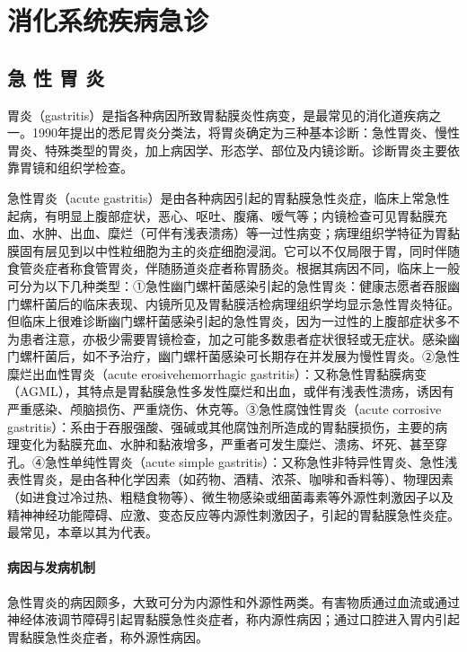 \part{消化系统疾病急诊}

\chapter{急 性 胃 炎}

胃炎（gastritis）是指各种病因所致胃黏膜炎性病变，是最常见的消化道疾病之一。1990年提出的悉尼胃炎分类法，将胃炎确定为三种基本诊断：急性胃炎、慢性胃炎、特殊类型的胃炎，加上病因学、形态学、部位及内镜诊断。诊断胃炎主要依靠胃镜和组织学检查。

急性胃炎（acute
gastritis）是由各种病因引起的胃黏膜急性炎症，临床上常急性起病，有明显上腹部症状，恶心、呕吐、腹痛、嗳气等；内镜检查可见胃黏膜充血、水肿、出血、糜烂（可伴有浅表溃疡）等一过性病变；病理组织学特征为胃黏膜固有层见到以中性粒细胞为主的炎症细胞浸润。它可以不仅局限于胃，同时伴随食管炎症者称食管胃炎，伴随肠道炎症者称胃肠炎。根据其病因不同，临床上一般可分为以下几种类型：①急性幽门螺杆菌感染引起的急性胃炎：健康志愿者吞服幽门螺杆菌后的临床表现、内镜所见及胃黏膜活检病理组织学均显示急性胃炎特征。但临床上很难诊断幽门螺杆菌感染引起的急性胃炎，因为一过性的上腹部症状多不为患者注意，亦极少需要胃镜检查，加之可能多数患者症状很轻或无症状。感染幽门螺杆菌后，如不予治疗，幽门螺杆菌感染可长期存在并发展为慢性胃炎。②急性糜烂出血性胃炎（acute
erosivehemorrhagic
gastritis）：又称急性胃黏膜病变（AGML），其特点是胃黏膜急性多发性糜烂和出血，或伴有浅表性溃疡，诱因有严重感染、颅脑损伤、严重烧伤、休克等。③急性腐蚀性胃炎（acute
corrosive
gastritis）：系由于吞服强酸、强碱或其他腐蚀剂所造成的胃黏膜损伤，主要的病理变化为黏膜充血、水肿和黏液增多，严重者可发生糜烂、溃疡、坏死、甚至穿孔。④急性单纯性胃炎（acute
simple
gastritis）：又称急性非特异性胃炎、急性浅表性胃炎，是由各种化学因素（如药物、酒精、浓茶、咖啡和香料等）、物理因素（如进食过冷过热、粗糙食物等）、微生物感染或细菌毒素等外源性刺激因子以及精神神经功能障碍、应激、变态反应等内源性刺激因子，引起的胃黏膜急性炎症。最常见，本章以其为代表。

\subsection{病因与发病机制}

急性胃炎的病因颇多，大致可分为内源性和外源性两类。有害物质通过血流或通过神经体液调节障碍引起胃黏膜急性炎症者，称内源性病因；通过口腔进入胃内引起胃黏膜急性炎症者，称外源性病因。


